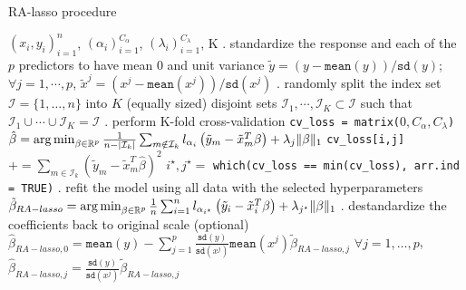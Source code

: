 \begin{algorithm}
\caption{RA-lasso procedure}\label{alg:ralasso}
\begin{algorithmic}
\Require $(x_i, y_i)_{i=1}^n$, $(\alpha_i)_{i=1}^{C_\alpha}$, $(\lambda_i)_{i=1}^{C_\lambda}$, K
. standardize the response and each of the $p$ predictors to have mean $0$ and unit variance
\State \quad $\tilde{y} = ( y - \texttt{mean}(y) ) / \texttt{sd}(y)$;
\State \quad $\forall j=1,\cdots,p$, \quad $\tilde{x}^j = ( x^j - \texttt{mean}(x^j) ) / \texttt{sd}(x^j)$
. randomly split the index set $\mathcal{I} = \{1,\dots,n\}$ into $K$ (equally sized) disjoint sets
\State \quad $\mathcal{I}_1, \cdots, \mathcal{I}_K \subset \mathcal{I}$ such that $\mathcal{I}_1 \cup \cdots \cup \mathcal{I}_K = \mathcal{I}$
. perform K-fold cross-validation
\State \quad \texttt{cv\_loss = matrix(}$0, C_\alpha, C_\lambda$\texttt{)}
\Indent
				\State $\hat{\beta} = \argmin_{\beta\in\mathbb{R}^p} 
						\frac{1}{n - |\mathcal{I}_k|}\sum_{m \notin \mathcal{I}_k} l_{\alpha_i} 
						\left( \tilde{y}_m - \tilde{x}_m^T\beta \right) + \lambda_j\|\beta\|_1$
				\State \texttt{cv\_loss[i,j]} $+= \sum_{m \in \mathcal{I}_k} 
												\left( \tilde{y}_m - \tilde{x}_m^T\hat{\beta} \right)^2$
			\EndFor
		\EndFor
	\EndFor
\EndIndent
\State \quad $i^\star, j^\star=$ \texttt{which(cv\_loss == min(cv\_loss), arr.ind = TRUE)}
. refit the model using all data with the selected hyperparameters
\State \quad $\tilde{\beta}_{RA-lasso} = \argmin_{\beta\in\mathbb{R}^p} \frac{1}{n}\sum_{i=1}^n l_{\alpha_{i^\star}} \left( \tilde{y}_i - \tilde{x}_i^T\beta \right) + \lambda_{j^\star}\|\beta\|_1$
. destandardize the coefficients back to original scale (optional)
\State \quad $\hat{\beta}_{RA-lasso, 0} = \texttt{mean}(y) - \sum_{j=1}^p \frac{\texttt{sd}(y)}{\texttt{sd}(x^j)}\texttt{mean}(x^j)\tilde{\beta}_{RA-lasso, j}$ 
\State \quad $\forall j = 1,\dots,p$, \quad $\hat{\beta}_{RA-lasso, j} = \frac{\texttt{sd}(y)}{\texttt{sd}(x^j)}\tilde{\beta}_{RA-lasso, j}$ 
\end{algorithmic}
\end{algorithm}
